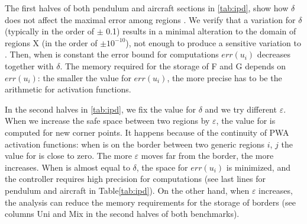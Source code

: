 The first halves of both pendulum and aircraft sections in \autoref{tab:ipd}, show how $\delta$ does not affect the maximal error among regions \maxUij. We verify that a variation for $\delta$ (typically in the order of $\pm$ 0.1) results in a minimal alteration to the domain of regions X (in the order of $\pm 10^{-10}$), not enough to produce a sensitive variation to \maxUij. Then, when \maxUij\space is constant the error bound for computations $err(u_{i})$ decreases together with $\delta$. The memory required for the storage of F and G depends on $err(u_{i})$: the smaller the value for $err(u_{i})$, the more precise has to be the arithmetic for activation functions. 

In the second halves in \autoref{tab:ipd}, we fix the value for $\delta$ and we try different $\varepsilon$. When we increase the safe space between two regions by $\varepsilon$, the value for \maxUij is computed for new corner points. It happens because of the continuity of PWA activation functions: when \statevarmath is on the border between two generic regions $i$, $j$ the value for \maxUij is close to zero. The more $\varepsilon$ moves \statevarmath far from the border, the more \maxUij increases. When \maxUij is almost equal to $\delta$, the space for $err(u_{i})$ is minimized, and the controller requires high precision for computations (see last lines for pendulum and aircraft in Table\ref{tab:ipd}). On the other hand, when $\varepsilon$ increases, the analysis can reduce the memory requirements for the storage of borders (see columns Uni and Mix in the second halves of both benchmarks).




